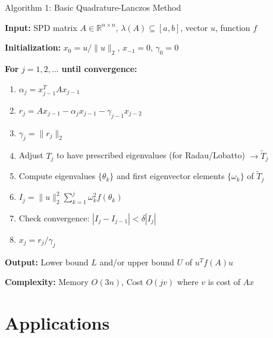 \documentclass[aspectratio=169, 12pt]{beamer}
\begin{document}
\begin{frame}{Algorithm 1: Basic Quadrature-Lanczos Method}

\textbf{Input:} SPD matrix \(A \in \mathbb{R}^{n \times n}\), \(\lambda(A) \subseteq [a, b]\), vector \(u\), function \(f\)

\vspace{0.2cm}

\textbf{Initialization:} \(x_0 = u/\|u\|_2\), \(x_{-1} = 0\), \(\gamma_0 = 0\)

\vspace{0.2cm}

\textbf{For} \(j = 1, 2, \ldots\) \textbf{until convergence:}
\begin{enumerate}
    \item \(\alpha_j = x_{j-1}^T A x_{j-1}\)
    \item \(r_j = A x_{j-1} - \alpha_j x_{j-1} - \gamma_{j-1} x_{j-2}\)
    \item \(\gamma_j = \|r_j\|_2\)
    \item Adjust \(T_j\) to have prescribed eigenvalues (for Radau/Lobatto) \(\rightarrow \tilde{T}_j\)
    \item Compute eigenvalues \(\{\theta_k\}\) and first eigenvector elements \(\{\omega_k\}\) of \(\tilde{T}_j\)
    \item \(I_j = \|u\|_2^2 \sum_{k=1}^j \omega_k^2 f(\theta_k)\)
    \item Check convergence: \(|I_j - I_{j-1}| < \delta |I_j|\)
    \item \(x_j = r_j / \gamma_j\)
\end{enumerate}

\vspace{0.2cm}

\textbf{Output:} Lower bound \(L\) and/or upper bound \(U\) of \(u^T f(A) u\)

\vspace{0.2cm}

\textbf{Complexity:} Memory \(O(3n)\), Cost \(O(jv)\) where \(v\) is cost of \(Ax\)

\end{frame}

\section{Applications}
\end{document}
